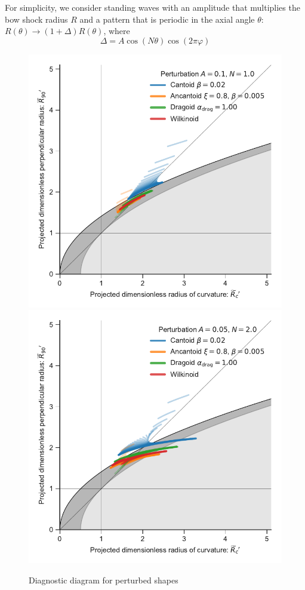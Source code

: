 For simplicity, we consider standing waves with an amplitude that
multiplies the bow shock radius \(R\) and a pattern that is periodic
in the axial angle \(\theta\): \(R(\theta) \to (1 + \Delta) R(\theta)\), where
\begin{equation}
  \label{eq:standing-wave}
  \Delta = A \cos(N \theta) \cos(2\pi \varphi)
\end{equation}

\begin{figure}
  \centering
  \includegraphics[width=\linewidth]
  {figs/wave-R90-vs-Rc-A010-N10}
  \includegraphics[width=\linewidth]
  {figs/wave-R90-vs-Rc-A005-N20}
  \caption{Diagnostic diagram for perturbed shapes}
  \label{fig:perturb-Rc-R90}
\end{figure}


